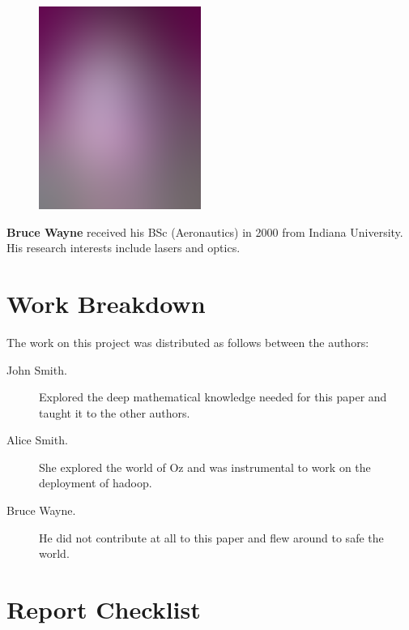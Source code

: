 \documentclass[9pt,twocolumn,twoside]{styles/osajnl}
\begin{document}
\begin{minipage}[t][3.2cm][t]{1.0\columnwidth} %
  \begin{figure}
    \includegraphics[width=0.25\columnwidth]{images/alice_smith.eps}
  \end{figure}
  \noindent
  {\bfseries Bruce Wayne} received his BSc (Aeronautics) in 2000 from
  Indiana University. His research interests include lasers and optics.
\end{minipage}
\endgroup

\newpage

\appendix

\section{Work Breakdown}

The work on this project was distributed as follows between the
authors:

\begin{description}

\item[John Smith.] Explored the deep mathematical knowledge needed for
  this paper and taught it to the other authors.

\item[Alice Smith.] She explored the world of Oz and was instrumental
  to work on the deployment of hadoop.

\item[Bruce Wayne.] He did not contribute at all to this paper and
  flew around to safe the world.  

\end{description}

\section{Report Checklist}
\end{document}
